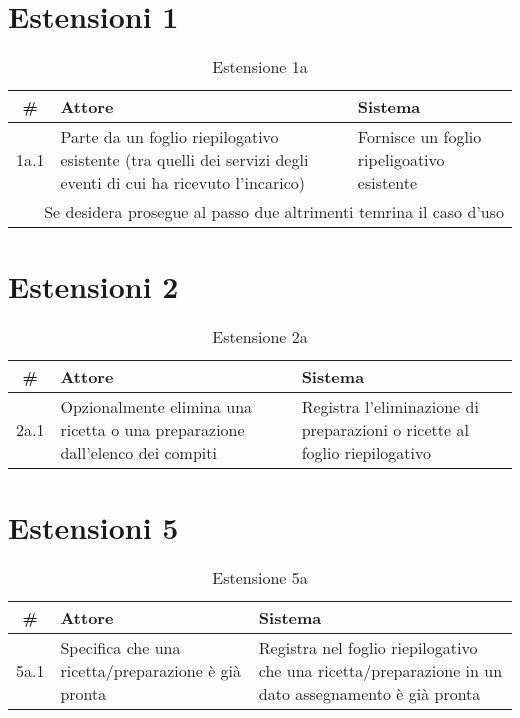 \section*{Estensioni 1}
\begin{table}[H]\centering\caption*{Estensione 1a}
    \small
    \begin{tabular}{|c|p{7cm}|p{6.23cm}|}
        \hline\bfseries \# & \bfseries Attore                                                                                               & \bfseries Sistema                          \\\hline
        1a.1               & Parte da un foglio riepilogativo esistente (tra quelli dei servizi degli eventi di cui ha ricevuto l’incarico) & Fornisce un foglio ripeligoativo esistente \\\hline
        \multicolumn{3}{|r|}{Se desidera prosegue al passo due altrimenti temrina il caso d'uso}                                                                                         \\\hline
    \end{tabular}
\end{table}

\section*{Estensioni 2}
\begin{table}[H]\centering\caption*{Estensione 2a}
    \small
    \begin{tabular}{|c|p{7cm}|p{6.23cm}|}
        \hline\bfseries \# & \bfseries Attore                                                             & \bfseries Sistema                                                         \\\hline
        2a.1               & Opzionalmente elimina una ricetta o una preparazione dall’elenco dei compiti & Registra l’eliminazione di preparazioni o ricette al foglio riepilogativo \\\hline
    \end{tabular}
\end{table}

\section*{Estensioni 5}
\begin{table}[H]\centering\caption*{Estensione 5a}
    \small
    \begin{tabular}{|c|p{7cm}|p{6.23cm}|}
        \hline\bfseries \# & \bfseries Attore                                    & \bfseries Sistema                                                                                   \\\hline
        5a.1               & Specifica che una ricetta/preparazione è già pronta & Registra nel foglio riepilogativo che una ricetta/preparazione in un dato assegnamento è già pronta \\\hline
    \end{tabular}
\end{table}

